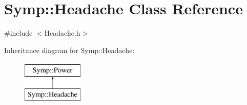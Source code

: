 \hypertarget{class_symp_1_1_headache}{\section{Symp\-:\-:Headache Class Reference}
\label{class_symp_1_1_headache}
}


{\ttfamily \#include $<$Headache.\-h$>$}

Inheritance diagram for Symp\-:\-:Headache\-:\begin{figure}[H]
\begin{center}
\leavevmode
\includegraphics[height=2.000000cm]{class_symp_1_1_headache}
\end{center}
\end{figure}
